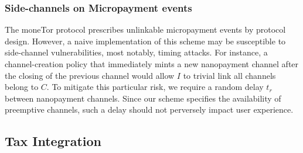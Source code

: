 \subsubsection{Side-channels on Micropayment events}

The moneTor protocol prescribes unlinkable micropayment events by protocol
design. However, a naive implementation of this scheme may be susceptible to
side-channel vulnerabilities, most notably, timing attacks. For instance, a
channel-creation policy that immediately mints a new nanopayment channel after
the closing of the previous channel would allow $I$ to trivial link all channels
belong to $C$. To mitigate this particular risk, we require a random delay $t_r$
between nanopayment channels. Since our scheme specifies the availability of
preemptive channels, such a delay should not perversely impact user experience.


\subsection{Tax Integration}

